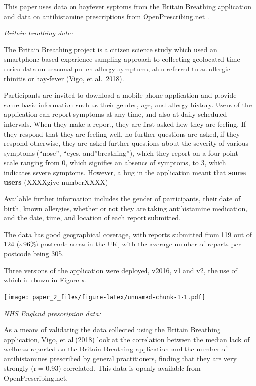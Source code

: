\documentclass[
]{article}
\begin{document}
This paper uses data on hayfever syptoms from the Britain Breathing
application and data on antihistamine prescriptions from
OpenPrescribing.net .

\emph{Britain breathing data:}

The Britain Breathing project is a citizen science study which used an
smartphone-based experience sampling approach to collecting geolocated
time series data on seasonal pollen allergy symptoms, also referred to
as allergic rhinitis or hay-fever (Vigo, et al.~2018).

Participants are invited to download a mobile phone application and
provide some basic information such as their gender, age, and allergy
history. Users of the application can report symptoms at any time, and
also at daily scheduled intervals. When they make a report, they are
first asked how they are feeling. If they respond that they are feeling
well, no further questions are asked, if they respond otherwise, they
are asked further questions about the severity of various symptoms
(``nose'', ``eyes, and''breathing''), which they report on a four point
scale ranging from 0, which signifies an absence of symptoms, to 3,
which indicates severe symptoms. However, a bug in the application meant
that \textbf{some users} (XXXXgive numberXXXX)

Available further information includes the gender of participants, their
date of birth, known allergies, whether or not they are taking
antihistamine medication, and the date, time, and location of each
report submitted.

The data has good geographical coverage, with reports submitted from 119
out of 124 (\textasciitilde96\%) postcode areas in the UK, with the
average number of reports per postcode being 305.

Three versions of the application were deployed, v2016, v1 and v2, the
use of which is shown in Figure x.

\texttt{[image: paper\_2\_files/figure-latex/unnamed-chunk-1-1.pdf]}

\emph{NHS England prescription data:}

As a means of validating the data collected using the Britain Breathing
application, Vigo, et al (2018) look at the correlation between the
median lack of wellness reported on the Britain Breathing application
and the number of antihistamines prescribed by general practitioners,
finding that they are very strongly (r = 0.93) correlated. This data is
openly available from OpenPrescribing.net.
\end{document}
